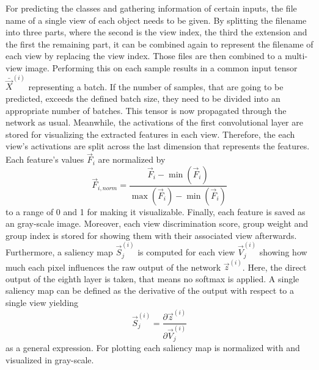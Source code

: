 For predicting the classes and gathering information of certain inputs, the file name of a single view of each object needs to be given.
By splitting the filename into three parts, where the second is the view index, the third the extension and the first the remaining part, it can be combined again to represent the filename of each view by replacing the view index.
Those files are then combined to a multi-view image.
Performing this on each sample results in a common input tensor $\bar{\vec{X}}^{(i)}$ representing a batch.
If the number of samples, that are going to be predicted, exceeds the defined batch size, they need to be divided into an appropriate number of batches.
This tensor is now propagated through the network as usual.
Meanwhile, the activations of the first convolutional layer are stored for visualizing the extracted features in each view.
Therefore, the each view's activations are split across the last dimension that represents the features.
Each feature's values $\vec{F}_i$ are normalized by
\begin{equation}
	\label{eq:normalize}
	\vec{F}_{i,norm} = \frac{\vec{F}_i - \min(\vec{F}_i)}{\max(\vec{F}_i) - \min(\vec{F}_i)} 
\end{equation}
to a range of 0 and 1 for making it visualizable.
Finally, each feature is saved as an gray-scale image.
Moreover, each view discrimination score, group weight and group index is stored for showing them with their associated view afterwards.
Furthermore, a saliency map $\vec{S}_j^{(i)}$ is computed for each view $\vec{V}_j^{(i)}$ showing how much each pixel influences the raw output of the network $\vec{z}^{(i)}$.
Here, the direct output of the eighth layer is taken, that means no softmax is applied.
A single saliency map can be defined as the derivative of the output with respect to a single view yielding
\begin{equation}
	\label{eq:saliency-map}
	\vec{S}_j^{(i)} = \frac{\partial \vec{z}^{(i)}}{\partial \vec{V}_j^{(i)}}
\end{equation}
as a general expression.
For plotting each saliency map is normalized with  and visualized in gray-scale.